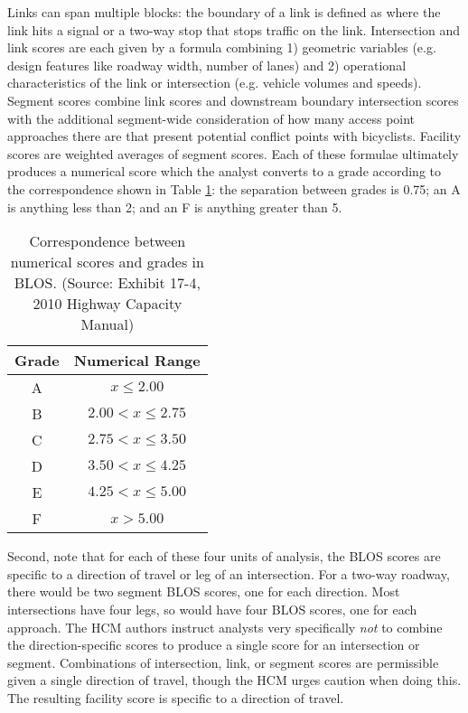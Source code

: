 \documentclass[11pt]{article} %
\begin{document}
Links can span multiple blocks: the boundary of a link is defined as where the link hits a signal or a two-way stop that stops traffic on the link. Intersection and link scores are each given by a formula combining 1) geometric variables (e.g. design features like roadway width, number of lanes) and 2) operational characteristics of the link or intersection (e.g. vehicle volumes and speeds). Segment scores combine link scores and downstream boundary intersection scores with the additional segment-wide consideration of how many access point approaches there are that present potential conflict points with bicyclists. Facility scores are weighted averages of segment scores.  Each of these formulae ultimately produces a numerical score which the analyst converts to a grade according to the correspondence shown in Table \ref{table:BLOS_Scale}: the separation between grades is 0.75; an A is anything less than 2; and an F is anything greater than 5. 


\begin{table}
\centering
\begin{tabular}{| c | c |} 

\hline
Grade & Numerical Range \\
\hline
A & $x \leq 2.00$ \\
\hline
B & $2.00 < x \leq 2.75$ \\
\hline
C & $2.75 < x \leq 3.50$ \\
\hline
D & $3.50 < x \leq 4.25$ \\
\hline
E & $4.25 < x \leq 5.00$ \\
\hline
F & $ x > 5.00$ \\
\hline
\end {tabular}
\caption{Correspondence between numerical scores and grades in BLOS. (Source: Exhibit 17-4, 2010 Highway Capacity Manual)}
\label{table:BLOS_Scale}
\end{table}


\vspace{12pt}

Second, note that for each of these four units of analysis, the BLOS scores are specific to a direction of travel or leg of an intersection. For a two-way roadway, there would be two segment BLOS scores, one for each direction. Most intersections have four legs, so would have four BLOS scores, one for each approach. The HCM authors instruct analysts very specifically \emph{not} to combine the direction-specific scores to produce a single score for an intersection or segment. Combinations of intersection, link, or segment scores are permissible given a single direction of travel, though the HCM urges caution when doing this. The resulting facility score is specific to a direction of travel.
\end{document}
